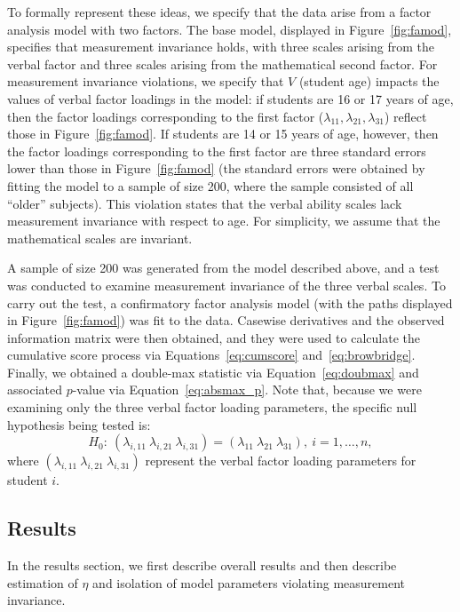 \documentclass[man]{apa}
\begin{document}
To formally represent these ideas, we specify that the data arise from
a factor analysis model with two factors.  The base model, displayed in
Figure~\ref{fig:famod}, specifies that measurement invariance holds,
with three scales arising from the verbal factor and three 
scales arising from the mathematical second factor.
For measurement invariance violations, we specify that $V$
(student age) impacts the values of 
verbal factor loadings in the model: 
if students are 16 or 17 years of age, then the factor
loadings corresponding to the first 
factor ($\lambda_{11}, \lambda_{21}, \lambda_{31}$) reflect those in
Figure~\ref{fig:famod}.  If students are 14 or 15 years of age,
however, then the factor loadings corresponding to the first factor
are three standard errors lower than those in Figure~\ref{fig:famod}
(the standard errors were obtained by fitting
  the model to a sample of size 200, where the sample consisted of all
  ``older'' subjects).
This violation states that the verbal ability scales
lack measurement invariance with respect to age.  For simplicity, we
assume that the mathematical scales are invariant.



A sample of size 200 was generated from the model described above, and
a test was conducted to examine measurement invariance of the three
verbal scales.  To carry out
the test, a confirmatory factor analysis model (with the paths
displayed in Figure~\ref{fig:famod}) was fit to the
data.  Casewise derivatives and 
the observed information matrix were then obtained, and they were used
to calculate the cumulative score process via
Equations~\eqref{eq:cumscore} and~\eqref{eq:browbridge}.  Finally, we
obtained a 
double-max statistic via Equation~\eqref{eq:doubmax} and associated
$p$-value via Equation~\eqref{eq:absmax_p}.  Note that, because we
were examining only the three verbal factor loading parameters, the
specific null hypothesis being tested is:
\begin{equation}
    \label{eq:exh0}
H_0:\ (\lambda_{i,11}\ \lambda_{i,21}\ \lambda_{i,31}) =
(\lambda_{11}\ \lambda_{21}\ \lambda_{31}),\ i=1,\ldots,n,
\end{equation}
where $(\lambda_{i,11}\ \lambda_{i,21}\ \lambda_{i,31})$ represent the
verbal factor loading parameters for student $i$.

\subsection{Results}
In the results section, we first describe overall results and then 
describe estimation of $\eta$ and 
isolation of model parameters violating
measurement invariance.
\end{document}
